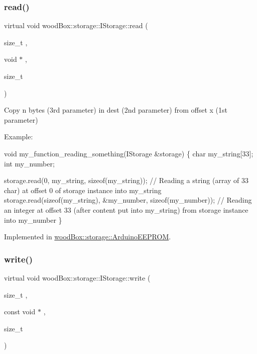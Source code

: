 \subsubsection{\texorpdfstring{read()}{read()}}
{\footnotesize\ttfamily virtual void wood\+Box\+::storage\+::\+I\+Storage\+::read (\begin{DoxyParamCaption}\item[{size\+\_\+t}]{,  }\item[{void $\ast$}]{,  }\item[{size\+\_\+t}]{ }\end{DoxyParamCaption})\hspace{0.3cm}{\ttfamily [pure virtual]}}

Copy n bytes (3rd parameter) in dest (2nd parameter) from offset x (1st parameter)

Example\+:


\begin{DoxyCode}
\textcolor{keywordtype}{void} my\_function\_reading\_something(IStorage &storage) \{
  \textcolor{keywordtype}{char} my\_string[33];
  \textcolor{keywordtype}{int} my\_number;

  storage.read(0, my\_string, \textcolor{keyword}{sizeof}(my\_string)); \textcolor{comment}{// Reading a string (array of 33 char) at offset 0 of
       storage instance into my\_string}
  storage.read(\textcolor{keyword}{sizeof}(my\_string), &my\_number, \textcolor{keyword}{sizeof}(my\_number)); \textcolor{comment}{// Reading an integer at offset 33 (after
       content put into my\_string) from storage instance into my\_number}
\}
\end{DoxyCode}
 

Implemented in \mbox{\hyperlink{classwood_box_1_1storage_1_1_arduino_e_e_p_r_o_m_a1b9deb25ea803456b5450f4e3782fd20}{wood\+Box\+::storage\+::\+Arduino\+E\+E\+P\+R\+OM}}.

\mbox{\label{classwood_box_1_1storage_1_1_i_storage_a5eb82c922e8a3147ddab510706be8e24}} 
\subsubsection{\texorpdfstring{write()}{write()}}
{\footnotesize\ttfamily virtual void wood\+Box\+::storage\+::\+I\+Storage\+::write (\begin{DoxyParamCaption}\item[{size\+\_\+t}]{,  }\item[{const void $\ast$}]{,  }\item[{size\+\_\+t}]{ }\end{DoxyParamCaption})\hspace{0.3cm}{\ttfamily [pure virtual]}}

